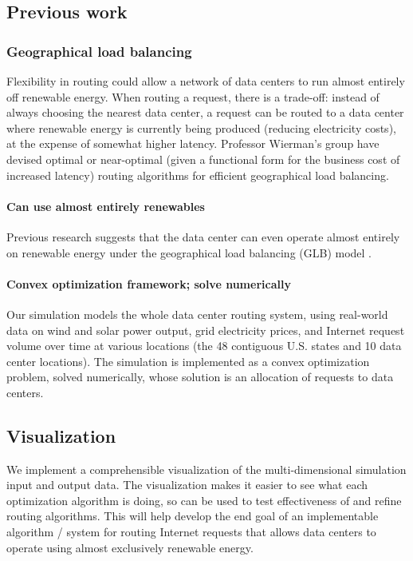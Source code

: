 \documentclass{acm_proc_article-sp}
\begin{document}
\subsection{Previous work}
	\subsubsection{Geographical load balancing}
		Flexibility in routing could allow a network of data centers to run almost entirely off renewable energy. When routing a request, there is a trade-off: instead of always choosing the nearest data center, a request can be routed to a data center where renewable energy is currently being produced (reducing electricity costs), at the expense of somewhat higher latency. Professor Wierman’s group have devised optimal or near-optimal (given a functional form for the business cost of increased latency) routing algorithms for efficient geographical load balancing.
		\paragraph{Can use almost entirely renewables}
			Previous research suggests that the data center can even operate almost entirely on renewable energy under the geographical load balancing (GLB) model \cite{adam:GLB}. 
		\paragraph{Convex optimization framework; solve numerically}
			Our simulation models the whole data center routing system, using real-world data on wind and solar power output, grid electricity prices, and Internet request volume over time at various locations (the 48 contiguous U.S. states and 10 data center locations). The simulation is implemented as a convex optimization problem, solved numerically, whose solution is an allocation of requests to data centers.


\subsection{Visualization}
We implement a comprehensible visualization of the multi-dimensional simulation input and output data. The visualization makes it easier to see what each optimization algorithm is doing, so can be used to test effectiveness of and refine routing algorithms. This will help develop the end goal of an implementable algorithm / system for routing Internet requests that allows data centers to operate using almost exclusively renewable energy.
\end{document}

